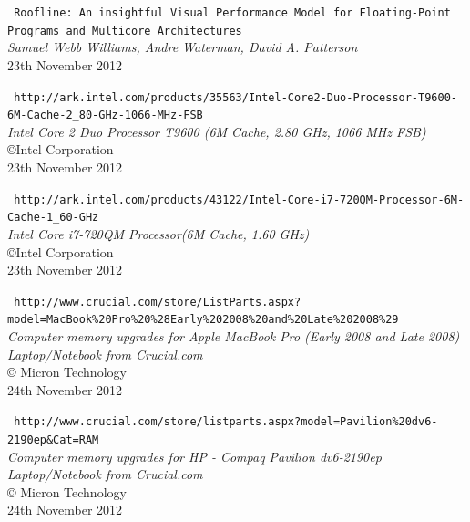 \documentclass[a4paper,10pt,openright,openbib]{article}
\begin{document}
\begin{thebibliography}{9}
	\texttt{\small
	Roofline: An insightful Visual Performance Model for Floating-Point Programs and Multicore Architectures}	\\
	\emph{Samuel Webb Williams, Andre Waterman, David A. Patterson}	\\
	23th November 2012

	\texttt{\small
	http://ark.intel.com/products/35563/Intel-Core2-Duo-Processor-T9600-6M-Cache-2\_80-GHz-1066-MHz-FSB}	\\
	\emph{Intel{\textregistered} Core {\texttrademark} 2 Duo Processor T9600 (6M Cache, 2.80 GHz, 1066 MHz FSB)}	\\
	{\copyright}Intel Corporation	\\
	23th November 2012

	\texttt{\small
	http://ark.intel.com/products/43122/Intel-Core-i7-720QM-Processor-6M-Cache-1\_60-GHz}	\\
	\emph{Intel{\textregistered} Core {\texttrademark} i7-720QM Processor(6M Cache, 1.60 GHz)}	\\
	{\copyright}Intel Corporation	\\
	23th November 2012

	\texttt{\small
	http://www.crucial.com/store/ListParts.aspx?model=MacBook\%20Pro\%20\%28Early\%202008\%20and\%20Late\%202008\%29}	\\
	\emph{Computer memory upgrades for Apple MacBook Pro (Early 2008 and Late 2008) Laptop/Notebook from Crucial.com }	\\
	{\copyright} Micron Technology	\\
	24th November 2012

	\texttt{\small
	http://www.crucial.com/store/listparts.aspx?model=Pavilion\%20dv6-2190ep\&Cat=RAM}	\\
	\emph{Computer memory upgrades for HP - Compaq Pavilion dv6-2190ep Laptop/Notebook from Crucial.com}	\\
	{\copyright} Micron Technology	\\
	24th November 2012	

\end{thebibliography}
\end{document}
